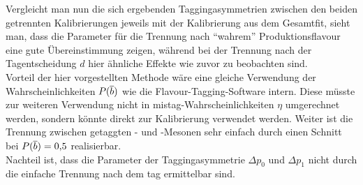 Vergleicht man nun die sich ergebenden Taggingasymmetrien zwischen den beiden getrennten Kalibrierungen jeweils mit der Kalibrierung aus dem Gesamtfit, sieht man, dass die Parameter für die Trennung nach \enquote{wahrem} Produktionsflavour eine gute Übereinstimmung zeigen, während bei der Trennung nach der Tagentscheidung $d$ hier ähnliche Effekte wie zuvor zu beobachten sind.\\
Vorteil der hier vorgestellten Methode wäre eine gleiche Verwendung der Wahrscheinlichkeiten $P({\overline {{b}}})$ wie die Flavour-Tagging-Software intern. Diese müsste zur weiteren Verwendung nicht in mistag-Wahrscheinlichkeiten $\eta$ umgerechnet werden, sondern könnte direkt zur Kalibrierung verwendet werden. Weiter ist die Trennung zwischen getaggten \Bz- und \Bzb-Mesonen sehr einfach durch einen Schnitt bei $P({\overline {{b}}})=0{,}5$ realisierbar.\\
Nachteil ist, dass die Parameter der Taggingasymmetrie $\Delta p_0$ und $\Delta p_1$ nicht durch die einfache Trennung nach dem tag ermittelbar sind. 
 
